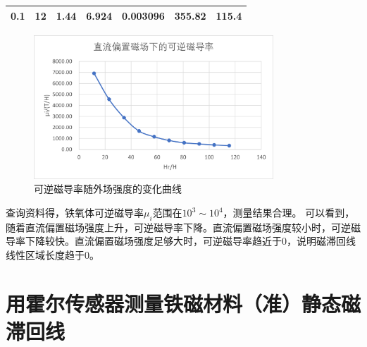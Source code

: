 \documentclass[11pt]{article}
\begin{document}
\begin{enumerate}
\begin{table}[H]
\begin{tabular}{|c|c|c|c|c|c|c|}
            0.1    & 12     & 1.44   & 6.924  & 0.003096 & 355.82  & 115.4 \\\hline
            \end{tabular}%
          \label{tab:可逆磁导率}%
        \end{table}%
        \begin{figure}[H]
            \centering
            \includegraphics[width=9cm]{Fig/8.png}
            \caption{可逆磁导率随外场强度的变化曲线}
        \end{figure}
        \hspace*{2em} 查询资料得，铁氧体可逆磁导率$\mu_i$范围在$10^3\sim 10^4$，测量结果合理。
        \newline \hspace*{2em}可以看到，随着直流偏置磁场强度上升，可逆磁导率下降。直流偏置磁场强度较小时，可逆磁导率下降较快。直流偏置磁场强度足够大时，可逆磁导率趋近于0，说明磁滞回线线性区域长度趋于0。

\end{enumerate}
\section{用霍尔传感器测量铁磁材料（准）静态磁滞回线}
\end{document}
